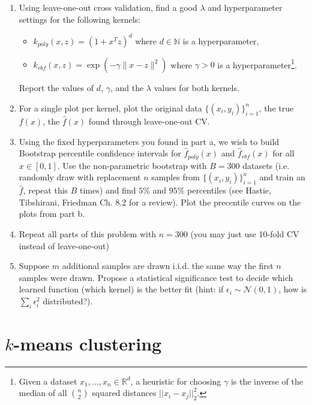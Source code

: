 \documentclass{article}
\newcommand{\field}[1]{\mathbb{#1}}
\newcommand{\1}{\mathbf{1}}
\newcommand{\R}{\field{R}} %
\begin{document}
\begin{enumerate}
  \item Using leave-one-out cross validation, find a good $\lambda$ and hyperparameter settings for the following kernels:
  \begin{itemize}
    \item $k_{poly}(x,z) = (1+x^Tz)^d$ where $d \in \mathbb{N}$ is a hyperparameter, 
    \item $k_{rbf}(x,z) = \exp(-\gamma \|x-z\|^2)$ where $\gamma > 0$ is a hyperparameter\footnote{Given a dataset $x_1,\dots,x_n \in \R^d$, a heuristic for choosing $\gamma$ is the inverse of the median of all $\binom{n}{2}$ squared distances $||x_i-x_j||_2^2$.}.
  \end{itemize} 
Report the values of $d$, $\gamma$, and the $\lambda$ values for both kernels.
  \item For a single plot per kernel, plot the original data $\{(x_i,y_i)\}_{i=1}^n$, the true $f(x)$, the $\widehat{f}(x)$ found through leave-one-out CV.
  \item Using the fixed hyperparameters you found in part a, we wish to build Bootstrap percentile confidence intervals for $\widehat{f}_{poly}(x)$ and $\widehat{f}_{rbf}(x)$ for all $x \in [0,1]$.
  Use the non-parametric bootstrap with $B=300$ datasets (i.e. randomly draw with replacement $n$ samples from $\{(x_i,y_i)\}_{i=1}^n$ and train an $\widehat{f}$, repeat this $B$ times) and find $5\%$ and $95\%$ percentiles (see Hastie, Tibshirani, Friedman Ch. 8.2 for a review). Plot the precentile curves on the plots from part b.
  \item Repeat all parts of this problem with $n=300$ (you may just use 10-fold CV instead of leave-one-out)
  \item Suppose $m$ additional samples are drawn i.i.d. the same way the first $n$ samples were drawn. Propose a statistical significance test to decide which learned function (which kernel) is the better fit (hint: if $\epsilon_i \sim \mathcal{N}(0,1)$, how is $\sum_i \epsilon_i^2$ distributed?).
\end{enumerate}


\section{$k$-means clustering}
\end{document}
